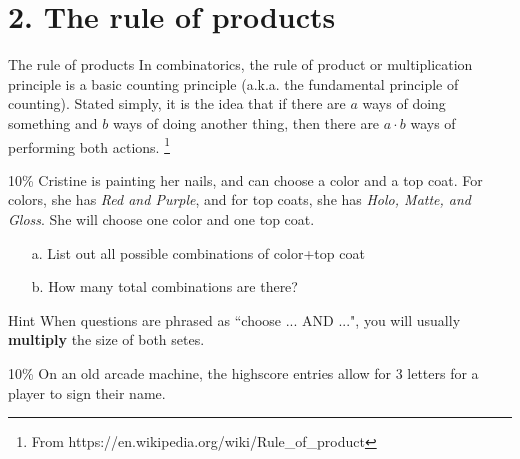 \documentclass[a4paper,12pt]{book}
\begin{document}
    \newpage
    \section*{2. The rule of products}

        \begin{intro}{The rule of products}
            In combinatorics, the rule of product or multiplication principle is a
            basic counting principle (a.k.a. the fundamental principle of counting).
            Stated simply, it is the idea that if there are $a$ ways of doing something and $b$
            ways of doing another thing, then there are $a \cdot b$ ways of performing both actions.
            \footnote{From https://en.wikipedia.org/wiki/Rule\_of\_product}
        \end{intro}

        \begin{question}{4}{10\%}
            Cristine is painting her nails, and can choose a color and a top coat.
            For colors, she has \textit{Red and Purple},
            and for top coats, she has \textit{Holo, Matte, and Gloss}.
            She will choose one color and one top coat.
        \end{question}

        \begin{enumerate}
            \item[a.] List out all possible combinations of color+top coat
            \item[b.] How many total combinations are there?
        \end{enumerate}

        \begin{hint}{Hint}
            When questions are phrased as ``choose ... AND ...",
            you will usually \textbf{multiply} the size of both setes.
        \end{hint}
        
        \hrulefill
        
        \begin{question}{5}{10\%}
            On an old arcade machine, the highscore entries allow for
            3 letters for a player to sign their name.
        \end{question}
\end{document}
